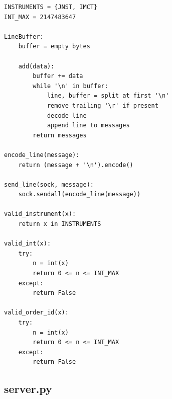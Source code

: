 \documentclass[11pt,a4paper]{article}
\begin{document}
\begin{lstlisting}[style=pseudocode]
INSTRUMENTS = {JNST, IMCT}
INT_MAX = 2147483647

LineBuffer:
    buffer = empty bytes

    add(data):
        buffer += data
        while '\n' in buffer:
            line, buffer = split at first '\n'
            remove trailing '\r' if present
            decode line
            append line to messages
        return messages

encode_line(message):
    return (message + '\n').encode()

send_line(sock, message):
    sock.sendall(encode_line(message))

valid_instrument(x):
    return x in INSTRUMENTS

valid_int(x):
    try:
        n = int(x)
        return 0 <= n <= INT_MAX
    except:
        return False

valid_order_id(x):
    try:
        n = int(x)
        return 0 <= n <= INT_MAX
    except:
        return False
\end{lstlisting}

\newpage
\subsection{{server.py}}
\end{document}
